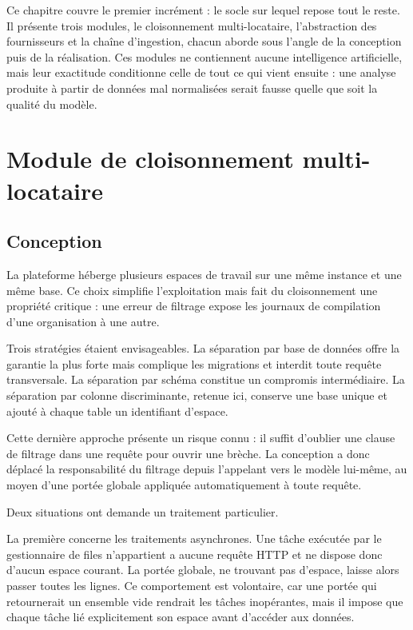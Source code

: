 \documentclass[12pt,a4paper,oneside]{report}
\begin{document}
Ce chapitre couvre le premier incrément : le socle sur lequel repose tout le
reste. Il présente trois modules, le cloisonnement multi-locataire,
l'abstraction des fournisseurs et la chaîne d'ingestion, chacun aborde sous
l'angle de la conception puis de la réalisation. Ces modules ne contiennent
aucune intelligence artificielle, mais leur exactitude conditionne celle de tout
ce qui vient ensuite : une analyse produite à partir de données mal normalisées
serait fausse quelle que soit la qualité du modèle.

\section{Module de cloisonnement multi-locataire}

\subsection{Conception}

La plateforme héberge plusieurs espaces de travail sur une même instance et une
même base. Ce choix simplifie l'exploitation mais fait du cloisonnement une
propriété critique : une erreur de filtrage expose les journaux de compilation
d'une organisation à une autre.

Trois stratégies étaient envisageables. La séparation par base de données offre
la garantie la plus forte mais complique les migrations et interdit toute requête
transversale. La séparation par schéma constitue un compromis intermédiaire. La
séparation par colonne discriminante, retenue ici, conserve une base unique et
ajouté à chaque table un identifiant d'espace.

Cette dernière approche présente un risque connu : il suffit d'oublier une clause
de filtrage dans une requête pour ouvrir une brèche. La conception a donc
déplacé la responsabilité du filtrage depuis l'appelant vers le modèle lui-même,
au moyen d'une portée globale appliquée automatiquement à toute requête.

Deux situations ont demande un traitement particulier.

La première concerne les traitements asynchrones. Une tâche exécutée par le
gestionnaire de files n'appartient a aucune requête HTTP et ne dispose donc
d'aucun espace courant. La portée globale, ne trouvant pas d'espace, laisse alors
passer toutes les lignes. Ce comportement est volontaire, car une portée qui
retournerait un ensemble vide rendrait les tâches inopérantes, mais il impose que
chaque tâche lié explicitement son espace avant d'accéder aux données.
\end{document}
